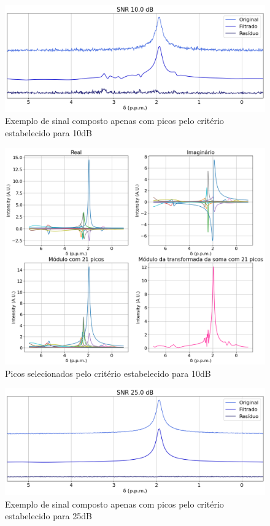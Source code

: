 \documentclass[12pt]{article}
\begin{document}
\begin{figure} [H]
    \centering
    \includegraphics[scale=0.5]{original-filtrado-residuo-10.png}
    \caption{Exemplo de sinal composto apenas com picos pelo critério estabelecido para 10dB}
    \label{fig:13}
\end{figure}

\begin{figure} [H]
    \centering
    \includegraphics[scale=0.5]{real-imag-modulo-10.png}
    \caption{Picos selecionados pelo critério estabelecido para 10dB}
    \label{fig:14}
\end{figure}

\begin{figure} [H]
    \centering
    \includegraphics[scale=0.5]{original-filtrado-residuo-25.png}
    \caption{Exemplo de sinal composto apenas com picos pelo critério estabelecido para 25dB}
    \label{fig:15}
\end{figure}
\end{document}
